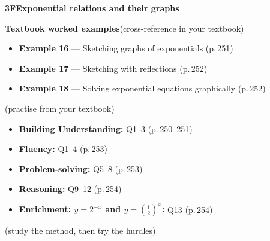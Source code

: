 \documentclass[11pt]{article}
\newcommand{\sectionband}[3]{%
  \needspace{5\baselineskip}\vspace{6pt}
  \begin{tcolorbox}[enhanced,colback=chalk,colframe=chalk,boxrule=0pt,left=12pt,right=12pt,top=8pt,bottom=8pt,arc=4pt,
      overlay={\node[anchor=east,text=white,opacity=0.9] at ([xshift=-12pt]frame.east) {\small\textsf{#3}};}]
    {\color{white}\large\bfseries\textsf{#1}\quad #2}
  \end{tcolorbox}}
\begin{document}
\sectionband{3F}{Exponential relations and their graphs}{CORE}

\begin{refbox}
{\bfseries\color{chalkdk}Textbook worked examples}\;\textcolor{inksoft}{\small(cross-reference in your textbook)}\\[3pt]
\begin{itemize}[leftmargin=16pt,itemsep=1pt,topsep=2pt]
  \item \textbf{Example 16} --- Sketching graphs of exponentials \textcolor{inksoft}{(p.\,251)}
  \item \textbf{Example 17} --- Sketching with reflections \textcolor{inksoft}{(p.\,252)}
  \item \textbf{Example 18} --- Solving exponential equations graphically \textcolor{inksoft}{(p.\,252)}
\end{itemize}
\;\textcolor{inksoft}{\small(practise from your textbook)}\\[3pt]
\begin{itemize}[leftmargin=16pt,itemsep=1pt,topsep=2pt]
  \item \textbf{Building Understanding:} Q1--3 \textcolor{inksoft}{(p.\,250--251)}
  \item \textbf{Fluency:} Q1--4 \textcolor{inksoft}{(p.\,253)}
  \item \textbf{Problem-solving:} Q5--8 \textcolor{inksoft}{(p.\,253)}
  \item \textbf{Reasoning:} Q9--12 \textcolor{inksoft}{(p.\,254)}
  \item \textbf{Enrichment: $y=2^{-x}$ and $y=\left(\tfrac12\right)^{x}$:} Q13 \textcolor{inksoft}{(p.\,254)}
\end{itemize}\end{refbox}

\;\textcolor{inksoft}{\small(study the method, then try the hurdles)}\par
\end{document}
